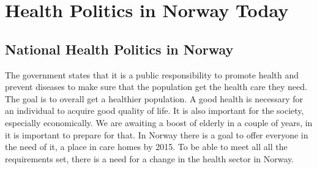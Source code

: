 \chapter{Health Politics in Norway Today}

\section{National Health Politics in Norway}
The government states that it is a public responsibility to promote health and prevent diseases to make sure that the population get the health care they need. The goal is to overall get a healthier population. A good health is necessary for an individual to acquire good quality of life. It is also important for the society, especially economically. We are awaiting a boost of elderly in a couple of years, in it is important to prepare for that. In Norway there is a goal to offer everyone in the need of it, a place in care homes by 2015.  To be able to meet all all the requirements set, there is a need for a change in the health sector in Norway.\\ \\
